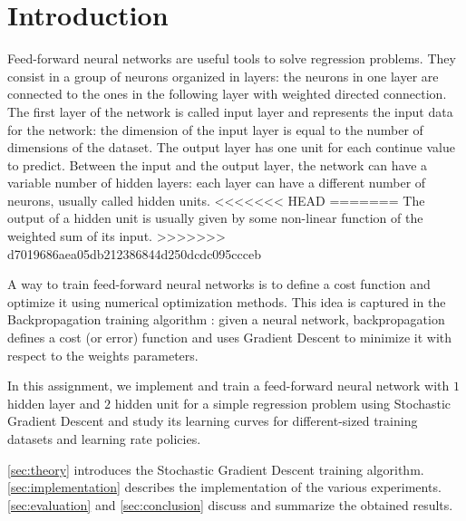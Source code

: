 \section{Introduction}
\label{sec:introduction}

Feed-forward neural networks are useful tools to solve regression problems.
They consist in a group of neurons organized in layers:
the neurons in one layer are connected to the ones in the following layer with weighted directed connection.
The first layer of the network is called input layer and represents the input data for the network:
the dimension of the input layer is equal to the number of dimensions of the dataset.
The output layer has one unit for each continue value to predict.
Between the input and the output layer, the network can have a variable number of hidden layers:
each layer can have a different number of neurons, usually called hidden units.
<<<<<<< HEAD
=======
The output of a hidden unit is usually given by some non-linear function of the weighted sum of its input.
>>>>>>> d7019686aea05db212386844d250dcdc095ccceb

A way to train feed-forward neural networks is to define a cost function and optimize it using numerical optimization methods.
This idea is captured in the Backpropagation training algorithm \cite{backpropagation}:
given a neural network, backpropagation defines a cost (or error) function and uses Gradient Descent to minimize it with respect to the weights parameters.

In this assignment, we implement and train a feed-forward neural network with $1$ hidden layer and $2$ hidden unit for a simple regression problem using Stochastic Gradient Descent and study its learning curves for different-sized training datasets and learning rate policies.

\cref{sec:theory} introduces the Stochastic Gradient Descent training algorithm.
\cref{sec:implementation} describes the implementation of the various experiments.
\cref{sec:evaluation} and \cref{sec:conclusion} discuss and summarize the obtained results.
